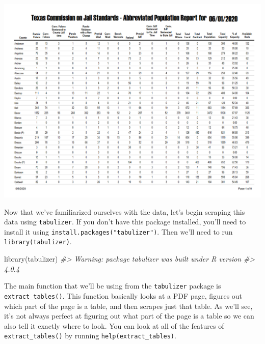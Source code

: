 \documentclass[
  12pt,
  openany]{book}
\newenvironment{Shaded}{\begin{snugshade}}{\end{snugshade}}
\newcommand{\CommentTok}[1]{\textcolor[rgb]{0.37,0.37,0.37}{\textit{#1}}}
\newcommand{\FunctionTok}[1]{\textcolor[rgb]{0,0,0}{#1}}
\newcommand{\NormalTok}[1]{#1}
\begin{document}
\includegraphics{images/tabulizer1.PNG}

Now that we've familiarized ourselves with the data, let's begin scraping this data using \texttt{tabulizer}. If you don't have this package installed, you'll need to install it using \texttt{install.packages("tabulizer")}. Then we'll need to run \texttt{library(tabulizer)}.

\begin{Shaded}
\begin{Highlighting}[]
\FunctionTok{library}\NormalTok{(tabulizer)}
\CommentTok{\#\textgreater{} Warning: package \textquotesingle{}tabulizer\textquotesingle{} was built under R version}
\CommentTok{\#\textgreater{} 4.0.4}
\end{Highlighting}
\end{Shaded}

The main function that we'll be using from the \texttt{tabulizer} package is \texttt{extract\_tables()}. This function basically looks at a PDF page, figures out which part of the page is a table, and then scrapes just that table. As we'll see, it's not always perfect at figuring out what part of the page is a table so we can also tell it exactly where to look. You can look at all of the features of \texttt{extract\_tables()} by running \texttt{help(extract\_tables)}.
\end{document}
